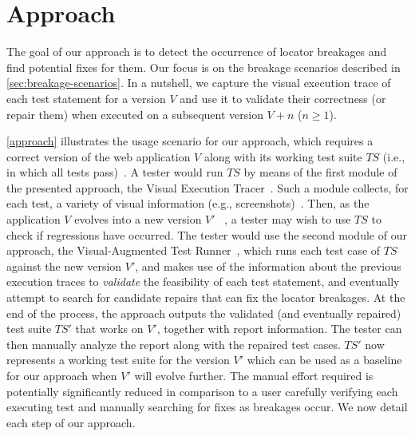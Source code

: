 \section{Approach}\label{sec:approach}

The goal of our approach is to detect the occurrence of locator breakages and find potential fixes for them. Our focus is on the breakage scenarios described in \autoref{sec:breakage-scenarios}.
%
%
In a nutshell, we capture the visual execution trace of each test statement for a version $V$ and use it to validate their correctness (or repair them) when executed on a subsequent version $V+n$ ($n \geq 1$). 

\autoref{approach} illustrates the usage scenario for our approach, which requires a correct version of the web application $V$ along with its working test suite $TS$ (i.e., in which all tests pass)~. 
A tester would run $TS$ by means of the first module of the presented approach, the Visual Execution Tracer~. Such a module collects, for each test, a variety of visual information (e.g., screenshots)~. 
Then, as the application $V$ evolves into a new version $V'$ ~, a tester may wish to use $TS$ to check if regressions have occurred. The tester would use the second module of our approach, the Visual-Augmented Test Runner~, which runs each test case of $TS$ against the new version $V'$, and makes use of the information about the previous execution traces to \textit{validate} the feasibility of each test statement, and eventually attempt to search for candidate repairs that can fix the locator breakages. At the end of the process, the approach outputs the validated (and eventually repaired) test suite $TS'$ that works on $V'$, together with report information. 
The tester can then manually analyze the report along with the repaired test cases. $TS'$ now represents a working test suite for the version $V'$ which can be used as a baseline for our approach when $V'$ will evolve further. 
The manual effort required is potentially significantly reduced in comparison to a user carefully verifying each executing test and manually searching for fixes as breakages occur. %
We now detail each step of our approach. 

